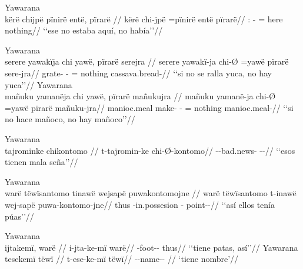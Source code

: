 \documentclass{memoir}
\begin{document}
\ex Yawarana \\
\label{ex-neg-pirare}    \begingl
    \glpreamble kërë chijpë pïnirë entë, pïrarë //
    \gla kërë chi-jpë =pïnirë entë pïrarë//
    \glb {}: - = here nothing//
        \glft ‘‘ese no estaba aquí, no había’’//  
    \endgl 
\xe

\pex\label{ex-neg-pirare-nsubj-jra}    \a Yawarana\\
    \label{desccasmaj-64}        \begingl
        \glpreamble serere yawakïja chi yawë, pïrarë serejra //
        \gla serere yawakï-ja chi-Ø =yawë pïrarë sere-jra//
        \glb  grate- - = nothing cassava.bread-//
            \glft ‘‘si no se ralla yuca, no hay yuca’’//  
        \endgl 
    \a Yawarana\\
    \label{desccasmaj-65}        \begingl
        \glpreamble mañuku yamanëja chi yawë, pïrarë mañukujra //
        \gla mañuku yamanë-ja chi-Ø =yawë pïrarë mañuku-jra//
        \glb manioc.meal make- - = nothing manioc.meal-//
            \glft ‘‘si no hace mañoco, no hay mañoco’’//  
        \endgl 
\xe

\ex Yawarana \\
\label{poss-aff-advpred-nsubj-cop}    \begingl
    \glpreamble tajrominke chikontomo //
    \gla t-tajromin-ke chi-Ø-kontomo//
    \glb --bad.news- --//
        \glft ‘‘esos tienen mala seña’’//  
    \endgl 
\xe

\ex Yawarana \\
\label{poss-aff-locpred-cop-nsubj}    \begingl
    \glpreamble warë tëwïsantomo tinawë wejsapë puwakontomojne //
    \gla warë tëwïsantomo t-inawë wej-sapë puwa-kontomo-jne//
    \glb thus  -in.possesion - point--//
        \glft ‘‘así ellos tenía púas’’//  
    \endgl 
\xe

\pex\label{poss-aff-npred-nsubj}    \a Yawarana\\
    \label{convinsectmaj-24}        \begingl
        \glpreamble ijtakemï, warë //
        \gla i-jta-ke-mï warë//
        \glb {}-foot-- thus//
            \glft ‘‘tiene patas, así’’//  
        \endgl 
    \a Yawarana\\
    \label{ctorosq-47}        \begingl
        \glpreamble tesekemï tëwï //
        \gla t-ese-ke-mï tëwï//
        \glb --name-- //
            \glft ‘tiene nombre’//  
        \endgl 
\xe
\end{document}
